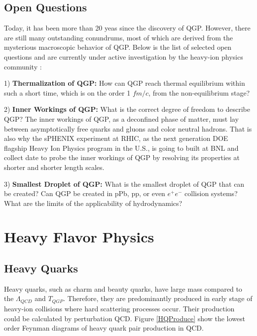 

 


\subsection{Open Questions}

Today, it has been more than 20 yeas since the discovery of QGP. However, there are still many outstanding conundrums, most of which are derived from the mysterious macroscopic behavior of QGP. Below is the list of selected open questions and are currently under active investigation by the heavy-ion physics community \cite{BigQuestions}:

1) \textbf{Thermalization of QGP:} How can QGP reach thermal equilibrium within such a short time, which is on the order 1 $fm/c$, from the non-equilibrium stage?

2) \textbf{Inner Workings of QGP:} What is the correct degree of freedom to describe QGP? The inner workings of QGP, as a deconfined phase of matter, must lay between asymptotically free quarks and gluons and color neutral hadrons. That is also why the sPHENIX experiment at RHIC, as the next generation DOE flagship Heavy Ion Physics program in the U.S., is going to built at BNL and collect date to probe the inner workings of QGP by resolving its properties at shorter and shorter length scales. 

3) \textbf{Smallest Droplet of QGP:} What is the smallest droplet of QGP that can be created? Can QGP be created in pPb, pp, or even $e^+e^-$ collision systems? What are the limits of the applicability of hydrodynamics?

\section{Heavy Flavor Physics}

\subsection{Heavy Quarks}

Heavy quarks, such as charm and beauty quarks, have large mass compared to the $\Lambda_{QCD}$ and $T_{QGP}$. Therefore, they are predominantly produced in early stage of heavy-ion collisions where hard scattering processes occur. Their production could be calculated by perturbation QCD. Figure \ref{HQProduce} show the lowest order Feynman diagrams of heavy quark pair production in QCD. 

